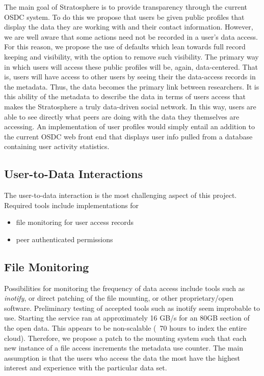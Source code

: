 \begin{multicols*}{2}
The main goal of Stratosphere is to provide transparency through the
current OSDC system. To do this we propose that users be given public profiles that
display the data they are working with and their contact information.
However, we are well aware that some actions need not be recorded in a
user's data access. For this reason, we propose the use of defaults
which lean towards full record keeping and visibility, with the option
to remove such visibility. The primary way in which users will access
these public profiles will be, again, data-centered. That is, users
will have access to other users by seeing their the
data-access records in the metadata. Thus, the data becomes the
primary link between researchers. It is this ability of the metadata 
to describe the data in terms of users access that makes the
Stratosphere a truly data-driven social network. In this way, users are able to see 
directly what peers are doing with the data they themselves are
accessing. An implementation of user profiles would simply
entail an addition to the current OSDC web front end that displays user info pulled
from a database containing user activity statistics. 

\subsection{User-to-Data Interactions}

The user-to-data interaction is the most challenging aspect of this
project. Required tools include implementations for
\begin{itemize}
\item file monitoring for user access records
\item peer authenticated permissions
\end{itemize}

\subsection{File Monitoring}

Possibilities for monitoring the frequency of data access include
tools such as \emph{inotify}, or direct patching of the file
mounting, or other proprietary/open software.  Preliminary testing of
accepted tools such as inotify seem improbable to use.  Starting the
service ran at approximately 16 GB/s for an 80GB section of the open
data. This appears to be non-scalable (~70 hours to index the entire
cloud). Therefore, we propose a patch to the mounting system such that
each new instance of a file access increments the metadata use
counter.  The main assumption is that the users who access the data
the most have the highest interest and experience with the particular
data set.


\end{multicols*}
